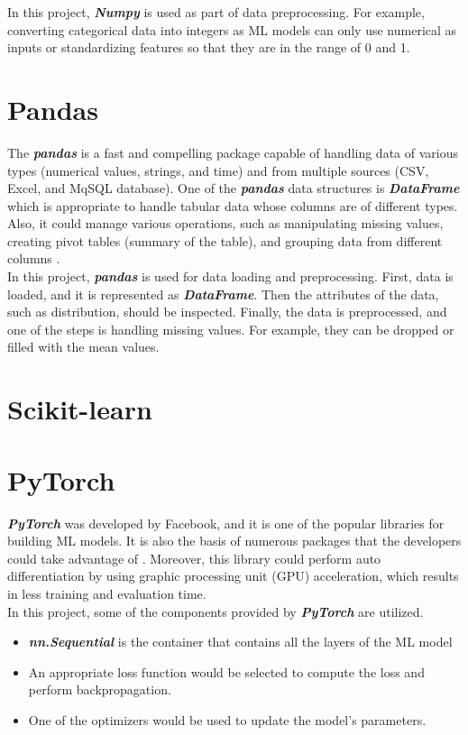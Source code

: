\documentclass[12pt,twoside]{report}
\begin{document}
In this project, \textit{\textbf{Numpy}} is used as part of data preprocessing. For example, converting categorical data into integers as ML models can only use numerical as inputs or standardizing features so that they are in the range of 0 and 1. 

\section{Pandas}
The \textbf{\textit{pandas}} is a fast and compelling package capable of handling data of various types (numerical values, strings, and time) and from multiple sources (CSV, Excel, and MqSQL database). One of the \textbf{\textit{pandas}} data structures is \textbf{\textit{DataFrame}} which is appropriate to handle tabular data whose columns are of different types. Also, it could manage various operations, such as manipulating missing values, creating pivot tables (summary of the table), and grouping data from different columns \citep{RN4}. 
\\

In this project, \textbf{\textit{pandas}} is used for data loading and preprocessing. First, data is loaded, and it is represented as \textbf{\textit{DataFrame}}. Then the attributes of the data, such as distribution, should be inspected. Finally, the data is preprocessed, and one of the steps is handling missing values. For example, they can be dropped or filled with the mean values. 

\section{Scikit-learn}

\section{PyTorch}
\textbf{\textit{PyTorch}} was developed by Facebook, and it is one of the popular libraries for building ML models. It is also the basis of numerous packages that the developers could take advantage of \citep{RN5}. Moreover, this library could perform auto differentiation by using graphic processing unit (GPU) acceleration, which results in less training and evaluation time. 
\\

In this project, some of the components provided by \textbf{\textit{PyTorch}} are utilized.
\begin{itemize}
	\item \textbf{\textit{nn.Sequential}} is the container that contains all the layers of the ML model
	\item An appropriate loss function would be selected to compute the loss and perform backpropagation. 
	\item One of the optimizers would be used to update the model's parameters. 
\end{itemize}
\end{document}
